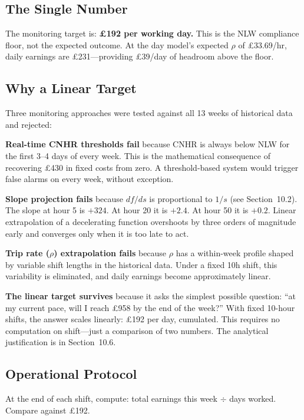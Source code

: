 \documentclass[a4paper,11pt]{article}
\begin{document}
\subsection{The Single Number}

The monitoring target is: \textbf{\pounds192 per working day.} This is the NLW compliance floor, not the expected outcome. At the day model's expected $\rho$ of \pounds33.69/hr, daily earnings are \pounds231---providing \pounds39/day of headroom above the floor.

\subsection{Why a Linear Target}

Three monitoring approaches were tested against all 13 weeks of historical data and rejected:

\textbf{Real-time CNHR thresholds fail} because CNHR is always below NLW for the first 3--4 days of every week. This is the mathematical consequence of recovering \pounds430 in fixed costs from zero. A threshold-based system would trigger false alarms on every week, without exception.

\textbf{Slope projection fails} because $df/ds$ is proportional to $1/s$ (see Section~10.2). The slope at hour 5 is $+324$. At hour 20 it is $+2.4$. At hour 50 it is $+0.2$. Linear extrapolation of a decelerating function overshoots by three orders of magnitude early and converges only when it is too late to act.

\textbf{Trip rate ($\rho$) extrapolation fails} because $\rho$ has a within-week profile shaped by variable shift lengths in the historical data. Under a fixed 10h shift, this variability is eliminated, and daily earnings become approximately linear.

\textbf{The linear target survives} because it asks the simplest possible question: ``at my current pace, will I reach \pounds958 by the end of the week?'' With fixed 10-hour shifts, the answer scales linearly: \pounds192 per day, cumulated. This requires no computation on shift---just a comparison of two numbers. The analytical justification is in Section~10.6.

\subsection{Operational Protocol}

At the end of each shift, compute: total earnings this week $\div$ days worked. Compare against \pounds192.
\end{document}
